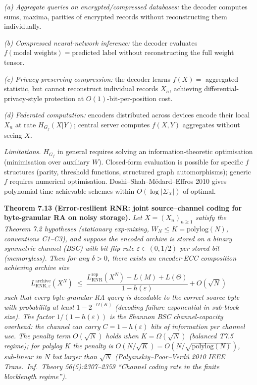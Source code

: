 \documentclass[
]{article}
\begin{document}
\emph{(a) Aggregate queries on encrypted/compressed databases:}
the decoder computes sums, maxima, parities of encrypted records
without reconstructing them individually.

\emph{(b) Compressed neural-network inference:} the decoder evaluates
$f(\text{model weights}) = \text{predicted label}$ without reconstructing
the full weight tensor.

\emph{(c) Privacy-preserving compression:} the decoder learns
$f(X) = $ aggregated statistic, but cannot reconstruct individual
records $X_n$, achieving differential-privacy-style protection at
$O(1)$-bit-per-position cost.

\emph{(d) Federated computation:} encoders distributed across devices
encode their local $X_n$ at rate $H_{G_f}(X | Y)$; central server
computes $f(X, Y)$ aggregates without seeing $X$.

\emph{Limitations.} $H_{G_f}$ in general requires solving an
information-theoretic optimisation (minimisation over auxiliary $W$).
Closed-form evaluation is possible for specific $f$ structures
(parity, threshold functions, structured graph automorphisms);
generic $f$ requires numerical optimisation. Doshi--Shah--M{\'e}dard--Effros
2010 gives polynomial-time achievable schemes within $O(\log |\Sigma_X|)$
of optimal.

\textbf{Theorem 7.13 (Error-resilient RNR: joint source--channel
coding for byte-granular RA on noisy storage).}
\emph{Let $X = (X_n)_{n \geq 1}$ satisfy the Theorem 7.2 hypotheses
(stationary exp-mixing, $W_N \leq K = \mathrm{polylog}(N)$,
conventions C1--C3), and suppose the encoded archive is stored on a
binary symmetric channel (BSC) with bit-flip rate
$\varepsilon \in (0, 1/2)$ per stored bit (memoryless). Then for any
$\delta > 0$, there exists an encoder-ECC composition achieving
archive size}
\[
L^{\mathrm{archive}}_{\mathrm{RNR}, \varepsilon}(X^N)
\;\leq\;
\frac{L^{\mathrm{rep}}_{\mathrm{RNR}}(X^N) + L(M) + L(\Theta)}{1 - h(\varepsilon)} + O(\sqrt{N})
\]
\emph{such that every byte-granular RA query is decodable to the
correct source byte with probability at least $1 - 2^{-\Omega(K)}$
(decoding failure exponential in sub-block size). The factor
$1/(1 - h(\varepsilon))$ is the Shannon BSC channel-capacity overhead:
the channel can carry $C = 1 - h(\varepsilon)$ bits of information per
channel use. The penalty term $O(\sqrt{N})$ holds when
$K = \Omega(\sqrt{N})$ (balanced T7.5 regime); for polylog $K$ the
penalty is $O(N/\sqrt{K}) = O(N/\sqrt{\mathrm{polylog}(N)})$,
sub-linear in $N$ but larger than $\sqrt{N}$ (Polyanskiy--Poor--Verd{\'u}
2010 \emph{IEEE Trans.\ Inf.\ Theory} 56(5):2307--2359 ``Channel coding
rate in the finite blocklength regime'').}
\end{document}
